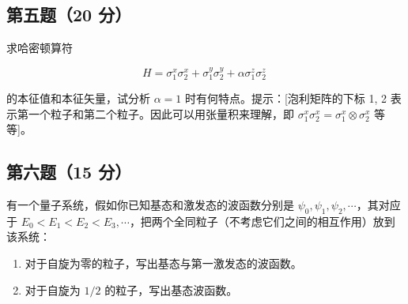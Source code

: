 \subsection{第五题（20 分）}
求哈密顿算符

\[
H = \sigma_1^x \sigma_2^x + \sigma_1^y \sigma_2^y + \alpha \sigma_1^z \sigma_2^z~
\]

的本征值和本征矢量，试分析 $\alpha = 1$ 时有何特点。提示：[泡利矩阵的下标 1, 2 表示第一个粒子和第二个粒子。因此可以用张量积来理解，即 $ \sigma_1^x \sigma_2^x = \sigma_1^x \otimes \sigma_2^x$ 等等]。
\subsection{第六题（15 分）}
有一个量子系统，假如你已知基态和激发态的波函数分别是 $\psi_0, \psi_1, \psi_2, \cdots$，其对应于 $E_0<E_1<E_2<E_3, \cdots$，把两个全同粒子（不考虑它们之间的相互作用）放到该系统：

\begin{enumerate}
    \item 对于自旋为零的粒子，写出基态与第一激发态的波函数。
    \item 对于自旋为 $1/2$ 的粒子，写出基态波函数。
\end{enumerate}

